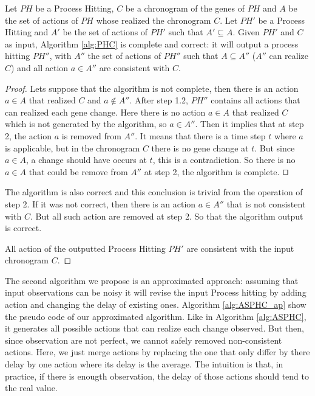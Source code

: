 \begin{theorem}
	\label{th:correct}
	Let $PH$ be a Process Hitting, $C$ be a chronogram of the genes of $PH$ and $A$ be the set of actions of $PH$ whose realized the chronogram $C$.
	Let $PH'$ be a Process Hitting and $A'$ be the set of actions of $PH'$ such that $A' \subseteq A$.
	Given $PH'$ and $C$ as input, Algorithm \ref{alg:PHC} is complete and correct: it will output a process hitting $PH''$,
	with $A''$ the set of actions of $PH''$ such that $A \subseteq A''$ ($A''$ can realize $C$) and all action $a \in A''$ are consistent with $C$.
	\begin{proof}
	Lets suppose that the algorithm is not complete, then there is an action $a \in A$ that realized $C$ and $a \not \in A''$.
	After step 1.2, $PH''$ contains all actions that can realized each gene change.
	Here there is no action $a \in A$ that realized $C$ which is not generated by the algorithm, so $a \in A''$.
	Then it implies that at step 2, the action $a$ is removed from $A''$.
	It means that there is a time step $t$ where $a$ is applicable, but in the chronogram $C$ there is no gene change at $t$.
	But since $a \in A$, a change should have occurs at $t$, this is a contradiction.
	So there is no $a \in A$ that could be remove from $A''$ at step 2, the algorithm is complete.
	$\qed$
	
	The algorithm is also correct and this conclusion is trivial from the operation of step 2.
	If it was not correct, then there is an action $a \in A''$ that is not consistent with $C$.
	But all such action are removed at step 2.
	So that the algorithm output is correct.
	
	All action of the outputted Process Hitting $PH'$ are consistent with the input chronogram $C$.
	\end{proof}
\end{theorem}

The second algorithm we propose is an approximated approach:
assuming that input observations can be noisy it will revise the input Process hitting by adding action and changing the delay of existing ones.
Algorithm \ref{alg:ASPHC_ap} show the pseudo code of our approximated algorithm.
Like in Algorithm \ref{alg:ASPHC}, it generates all possible actions that can realize each change observed.
But then, since observation are not perfect, we cannot safely removed non-consistent actions.
Here, we just merge actions by replacing the one that only differ by there delay by one action where its delay is the average.
The intuition is that, in practice, if there is enougth observation, the delay of those actions should tend to the real value.

